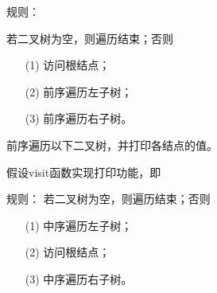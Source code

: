 \begin{frame}
\textcolor{acolor5}{规则：}

若二叉树为空，则遍历结束；否则
\begin{itemize}
\item[(1)] 访问根结点；
\item[(2)] 前序遍历左子树；
\item[(3)] 前序遍历右子树。
\end{itemize}
\end{frame}
%
\begin{frame}[fragile]
\begin{figure}
\centering

\end{figure} 
\end{frame}
%
\begin{frame}


\end{frame}
%
\begin{frame}
前序遍历以下二叉树，并打印各结点的值。
\begin{figure}
\centering

\end{figure}

\end{frame}
%
\begin{frame}
假设visit函数实现打印功能，即

\end{frame}
%
%
%
%
%
\begin{frame}
\textcolor{acolor5}{规则：}
若二叉树为空，则遍历结束；否则
\begin{itemize}
\item[(1)] 中序遍历左子树；
\item[(2)] 访问根结点；
\item[(3)] 中序遍历右子树。
\end{itemize}
\end{frame}
%
\begin{frame}[fragile]
\begin{figure}
\centering

\end{figure}  
\end{frame}
%
%
%
\begin{frame}


\end{frame}
%

